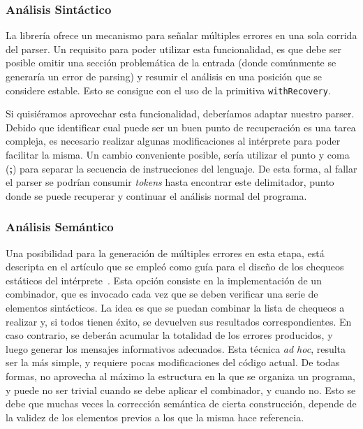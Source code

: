\subsubsection{Análisis Sintáctico}

La librería \Megaparsec{} ofrece un mecanismo para señalar múltiples errores en una sola corrida del parser.
Un requisito para poder utilizar esta funcionalidad, es que debe ser posible omitir una sección problemática de la entrada (donde comúnmente se generaría un error de parsing) y resumir el análisis en una posición que se considere estable.
Esto se consigue con el uso de la primitiva \lstinline[style = haskell]{withRecovery}.

Si quisiéramos aprovechar esta funcionalidad, deberíamos adaptar nuestro parser.
Debido que identificar cual puede ser un buen punto de recuperación es una tarea compleja, es necesario realizar algunas modificaciones al intérprete para poder facilitar la misma.
Un cambio conveniente posible, sería utilizar el punto y coma (\textbf{;}) para separar la secuencia de instrucciones del lenguaje.
De esta forma, al fallar el parser se podrían consumir \textit{tokens} hasta encontrar este delimitador, punto donde se puede recuperar y continuar el análisis normal del programa.

\subsubsection{Análisis Semántico}

Una posibilidad para la generación de múltiples errores en esta etapa, está descripta en el artículo que se empleó como guía para el diseño de los chequeos estáticos del intérprete~\cite{MonadicTC}.
Esta opción consiste en la implementación de un combinador, que es invocado cada vez que se deben verificar una serie de elementos sintácticos.
La idea es que se puedan combinar la lista de chequeos a realizar y, si todos tienen éxito, se devuelven sus resultados correspondientes.
En caso contrario, se deberán acumular la totalidad de los errores producidos, y luego generar los mensajes informativos adecuados.
Esta técnica \textit{ad hoc}, resulta ser la más simple, y requiere pocas modificaciones del código actual.
De todas formas, no aprovecha al máximo la estructura en la que se organiza un programa, y puede no ser trivial cuando se debe aplicar el combinador, y cuando no.
Esto se debe que muchas veces la corrección semántica de cierta construcción, depende de la validez de los elementos previos a los que la misma hace referencia.

